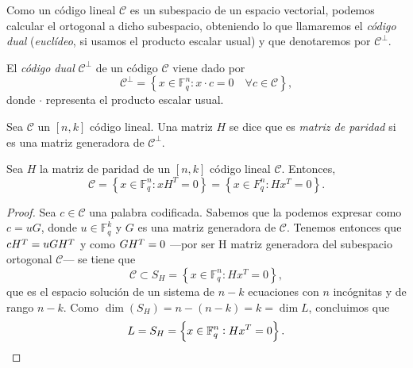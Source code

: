 
Como un código lineal \(\mathcal C\) es un subespacio de un espacio vectorial, podemos calcular el ortogonal a dicho subespacio, obteniendo lo que llamaremos el \textit{código dual} (\textit{euclídeo}, si usamos el producto escalar usual) y que denotaremos por \(\mathcal C^{\perp}\).

\begin{definition}
  El \textit{código dual} \(\mathcal C^{\perp}\) de un código \(\mathcal C\) viene dado por \[\mathcal C^{\perp} = \left\{x \in \mathbb F_q^n : x \cdot c = 0 \quad \forall c \in \mathcal C\right\},\]
  donde \(\cdot\) representa el producto escalar usual.
\end{definition}

\begin{definition}
  Sea \(\mathcal C\) un \([n, k]\) código lineal. Una matriz \(H\) se dice que es \textit{matriz de paridad} si es una matriz generadora de \(\mathcal C^{\perp}\).
\end{definition}

\begin{proposition}
  \label{prop:cod-por-matriz-paridad}
  Sea \(H\) la matriz de paridad de un \([n, k]\) código lineal \(\mathcal C\). 
  Entonces, \[\mathcal C = \left\{x \in \mathbb F_q^n : xH^T = 0\right\} = \left\{x \in F_q^n : Hx^T = 0\right\}.\]
\end{proposition}

\begin{proof}
  Sea \(c \in \mathcal C\) una palabra codificada. 
  Sabemos que la podemos expresar como \(c = uG\), donde \(u \in \mathbb F_q^k\) y \(G\) es una matriz generadora de \(\mathcal C\). 
  Tenemos entonces que \(c\cramped{H^T} = uG\cramped{H^T}\) y como \(G\cramped{H^T} = 0\) —por ser H matriz generadora del subespacio ortogonal \(\mathcal C\)— se tiene que \[\mathcal C \subset S_H = \left\{x \in \mathbb F_q^n : Hx^T = 0\right\},\] que es el espacio solución de un sistema de \(n - k\) ecuaciones con \(n\) incógnitas y de rango \(n - k\). Como \(\dim(S_H) = n - (n - k) = k = \dim L\), concluimos que \[L = S_H = \left\{x \in \mathbb F_q^n : Hx^T = 0\right\}.\qedhere\]
\end{proof}

